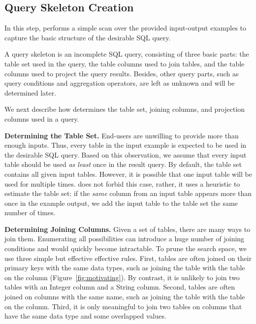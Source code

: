 \subsection{Query Skeleton Creation}
\label{sec:skeleton}

In this step, \ourtool performs a simple scan over
the provided input-output examples to capture the basic
structure of the desirable SQL query.

A query skeleton is an incomplete SQL query, consisting
of three basic parts: the table set used in the query, 
the table columns used to join tables, and the table
columns used to project the query results. Besides,
other query parts, such as query conditions and
aggregation operators, are left as unknown and will be
determined later.

We next describe how \ourtool determines the table set,
joining columns, and projection columns used in a query.



\vspace{1mm}
{\textbf{Determining the Table Set.}} 
End-users are unwilling to provide more than enough
inputs. Thus, every table in the input example
is expected to be used in the desirable SQL query.
Based on this observation, we assume that every input table
should be used \textit{as least} once in the result query. 
By default, the table set contains all given input tables.
However, it is possible that one input table will be
used for multiple times.
\ourtool does not forbid this case,
rather, it uses a heuristic
to estimate the table set: if the \textit{same} column from
an input table appears more than once in the
example output, we add the input table to the table set the same
number of times.



{\textbf{Determining Joining Columns. }} Given a set of tables,
there are many ways to join them. Enumerating all possibilities can
introduce a huge number of joining conditions and would quickly
become intractable. To prune the search space, we use
three simple but effective effective rules. 
First, tables are often joined on their primary keys with
the same data types, such as joining the  table with
the  table on the  column (Figure~\ref{fig:motivating}).
By contrast, it is unlikely to join two tables with an
Integer column and a String column. Second, tables are often joined
on columns with the same name, such as joining the  table
with the  table on the
 column. Third, it is only meaningful
to join two tables on columns that have the same data type and some
overlapped values. 


